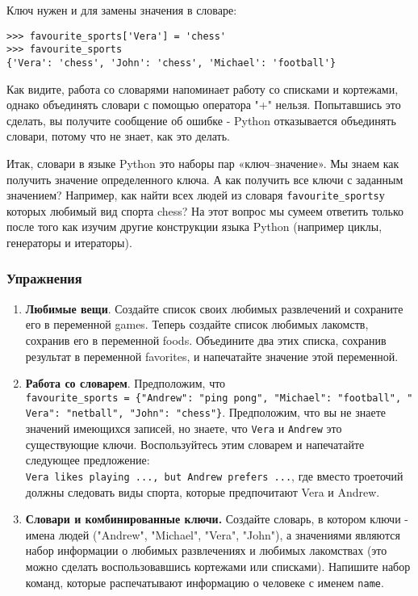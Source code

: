 \documentclass[11pt]{article}
\begin{document}
Ключ нужен и для замены значения в словаре:

\begin{verbatim}
>>> favourite_sports['Vera'] = 'chess'
>>> favourite_sports
{'Vera': 'chess', 'John': 'chess', 'Michael': 'football'}
\end{verbatim}

Как видите, работа со словарями напоминает работу со списками и
кортежами, однако объединять словари с помощью оператора "+" нельзя.
Попытавшись это сделать, вы получите сообщение об ошибке - Python
отказывается объединять словари, потому что не знает, как это делать.

Итак, словари в языке Python это наборы пар «ключ--значение». Мы знаем
как получить значение определенного ключа. А как получить все ключи с
заданным значением? Например, как найти всех людей из словаря
\texttt{favourite\_sports}у которых любимый вид спорта chess? На этот
вопрос мы сумеем ответить только после того как изучим другие
конструкции языка Python (например циклы, генераторы и итераторы).

\subsubsection{Упражнения}\label{ux443ux43fux440ux430ux436ux43dux435ux43dux438ux44f}

\begin{enumerate}
\def\labelenumi{\arabic{enumi}.}
\item
  \textbf{Любимые вещи}. Создайте список своих любимых развлечений и
  сохраните его в переменной games. Теперь создайте список любимых
  лакомств, сохранив его в переменной foods. Объедините два этих списка,
  сохранив результат в переменной favorites, и напечатайте значение этой
  переменной.
\item
  \textbf{Работа со словарем}. Предположим, что
  \texttt{favourite\_sports\ =\ \{"Andrew":\ "ping\ pong",\ "Michael":\ "football",\ "Vera":\ "netball",\ "John":\ "chess"\}}.
  Предположим, что вы не знаете значений имеющихся записей, но знаете,
  что \texttt{Vera} и \texttt{Andrew} это существующие ключи.
  Воспользуйтесь этим словарем и напечатайте следующее предложение:
  \texttt{Vera\ likes\ playing\ ...,\ but\ Andrew\ prefers\ ...}, где
  вместо троеточий должны следовать виды спорта, которые предпочитают
  Vera и Andrew.
\item
  \textbf{Словари и комбинированные ключи.} Создайте словарь, в котором
  ключи - имена людей ("Andrew", "Michael", "Vera", "John"), а
  значениями являются набор информации о любимых развлечениях и любимых
  лакомствах (это можно сделать воспользовавшись кортежами или
  списками). Напишите набор команд, которые распечатывают информацию о
  человеке с именем \texttt{name}.
\end{enumerate}


    
    
    
    
\end{document}

